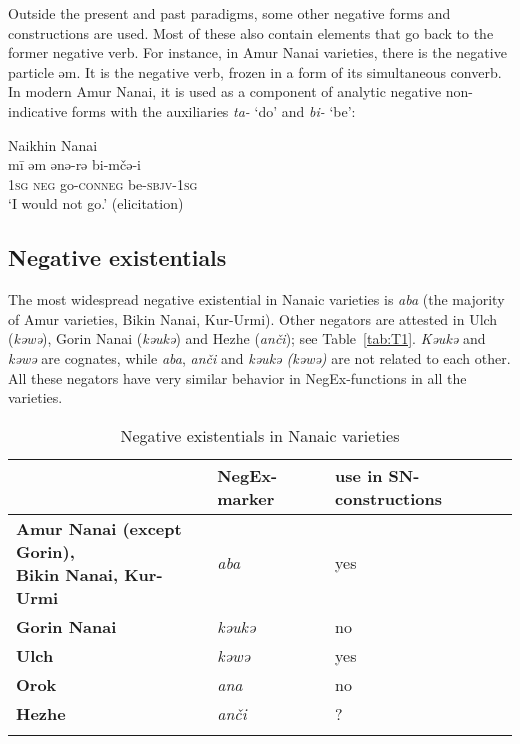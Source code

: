 \documentclass[output=paper]{langscibook}
\begin{document}
Outside the present and past paradigms, some other negative forms and constructions are used. Most of these also contain elements that go back to the former negative verb. For instance, in Amur Nanai varieties, there is the negative particle əm. It is the negative verb, frozen in a form of its simultaneous converb. In modern Amur Nanai, it is used as a component of analytic negative non-indicative forms with the auxiliaries \textit{ta-} ‘do’ and \textit{bi-} ‘be’:

\ea Naikhin Nanai \label{ex:T7}\\
	\gll mī	əm	ənə-rə	bi-mčə-i\\
	\textsc{1sg}	\textsc{neg}	go-\textsc{conneg}	be-\textsc{sbjv-1sg}\\
	\glt `I would not go.' (elicitation)
\z

\subsection{Negative existentials}\label{sec:T4.2}

The most widespread negative existential in Nanaic varieties is \textit{aba} (the majority of Amur varieties, Bikin Nanai, Kur-Urmi). Other negators are attested in Ulch (\textit{kəwə}), Gorin Nanai (\textit{kəukə}) and Hezhe (\textit{anči}); see Table \ref{tab:T1}. \textit{Kəukə} and \textit{kəwə} are cognates, while \textit{aba}, \textit{anči} and \textit{kəukə (kəwə)} are not related to each other. All these negators have very similar behavior in NegEx-functions in all the varieties.

\begin{table}
    \caption{Negative existentials in Nanaic varieties}
    \label{tab:T2}
    \begin{tabularx}{\textwidth}{Qll}
    \lsptoprule
    & \textbf{NegEx-marker} & \textbf{use in SN-constructions} \\ \midrule
    \textbf{Amur Nanai (except Gorin),\newline Bikin Nanai, Kur-Urmi} & \textit{aba} & yes \\
    \textbf{Gorin Nanai} & \textit{kəukə} & no \\
    \textbf{Ulch} & \textit{kəwə} & yes \\
    \textbf{Orok} & \textit{ana} & no \\
    \textbf{Hezhe} & \textit{anči} & ?\footnotemark \\ \lspbottomrule
    \end{tabularx}
\end{table}
\end{document}
